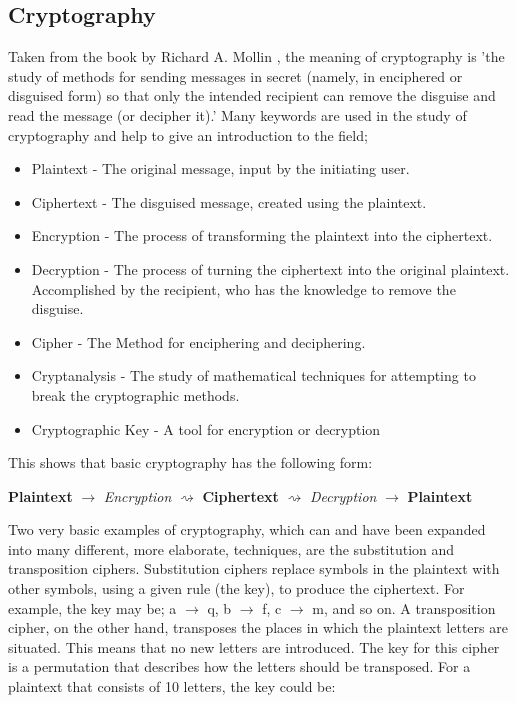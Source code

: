 \documentclass[a4paper,10pt]{report}
\begin{document}
\subsection{Cryptography}

Taken from the book by Richard A. Mollin \cite{richardmollin}, the meaning of cryptography is 'the study of methods for sending messages in secret (namely, in enciphered or disguised form) so that only the intended recipient can remove the disguise and read the message (or decipher it).' Many keywords are used in the study of cryptography and help to give an introduction to the field; 

\begin{itemize}
 \item Plaintext - The original message, input by the initiating user.
 \item Ciphertext - The disguised message, created using the plaintext.
 \item Encryption - The process of transforming the plaintext into the ciphertext.
 \item Decryption - The process of turning the ciphertext into the original plaintext. Accomplished by the recipient, who has the knowledge to remove the disguise.
 \item Cipher - The Method for enciphering and deciphering.
 \item Cryptanalysis - The study of mathematical techniques for attempting to break the cryptographic methods.
 \item Cryptographic Key - A tool for encryption or decryption
\end{itemize}

\noindent
This shows that basic cryptography has the following form:

\begin{center}

  \textbf{Plaintext} $\rightarrow$ \emph{Encryption} $\rightsquigarrow$ \textbf{Ciphertext} $\rightsquigarrow$ \emph{Decryption} $\rightarrow$ \textbf{Plaintext}

\end{center}

\noindent
Two very basic examples of cryptography, which can and have been expanded into many different, more elaborate, techniques, are the substitution and transposition ciphers. Substitution ciphers replace symbols in the plaintext with other symbols, using a given rule (the key), to produce the ciphertext. For example, the key may be; a $\rightarrow$ q, b $\rightarrow$  f, c $\rightarrow$  m, and so on. A transposition cipher, on the other hand, transposes the places in which the plaintext letters are situated. This means that no new letters are introduced. The key for this cipher is a permutation that describes how the letters should be transposed. For a plaintext that consists of 10 letters, the key could be:
\end{document}
